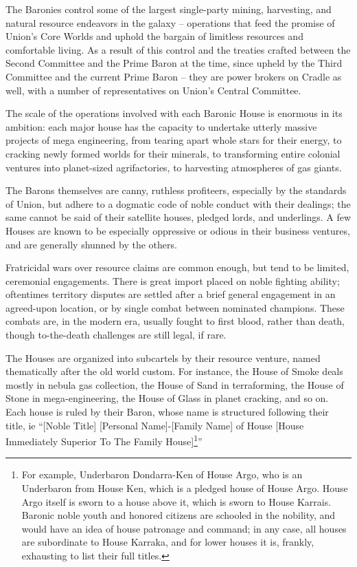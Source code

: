 The Baronies control some of the largest single-party mining, harvesting, and natural resource
endeavors in the galaxy -- operations that feed the promise of Union's Core Worlds and uphold
the bargain of limitless resources and comfortable living. As a result of this control and the
treaties crafted between the Second Committee and the Prime Baron at the time, since upheld
by the Third Committee and the current Prime Baron -- they are power brokers on Cradle as well,
with a number of representatives on Union's Central Committee.

The scale of the operations involved with each Baronic House is enormous in its ambition: each
major house has the capacity to undertake utterly massive projects of mega engineering, from
tearing apart whole stars for their energy, to cracking newly formed worlds for their minerals, to
transforming entire colonial ventures into planet-sized agrifactories, to harvesting atmospheres of
gas giants.

The Barons themselves are canny, ruthless profiteers, especially by the standards of Union, but
adhere to a dogmatic code of noble conduct with their dealings; the same cannot be said of their
satellite houses, pledged lords, and underlings. A few Houses are known to be especially
oppressive or odious in their business ventures, and are generally shunned by the others.

Fratricidal wars over resource claims are common enough, but tend to be limited, ceremonial
engagements. There is great import placed on noble fighting ability; oftentimes territory disputes
are settled after a brief general engagement in an agreed-upon location, or by single combat
between nominated champions. These combats are, in the modern era, usually fought to first
blood, rather than death, though to-the-death challenges are still legal, if rare.

The Houses are organized into subcartels by their resource venture, named thematically after the
old world custom. For instance, the House of Smoke deals mostly in nebula gas collection, the
House of Sand in terraforming, the House of Stone in mega-engineering, the House of Glass in
planet cracking, and so on. Each house is ruled by their Baron, whose name is structured
following their title, ie ``[Noble Title] [Personal Name]-[Family Name] of House [House Immediately
Superior To The Family House]\footnote{For example, Underbaron Dondarra-Ken of House Argo, who is an Underbaron from House Ken, which is
a pledged house of House Argo. House Argo itself is sworn to a house above it, which is sworn to House
Karrais. Baronic noble youth and honored citizens are schooled in the nobility, and would have an idea of
house patronage and command; in any case, all houses are subordinate to House Karraka, and for lower
houses it is, frankly, exhausting to list their full titles.}''

